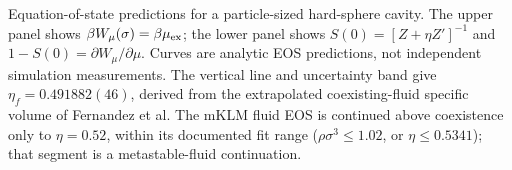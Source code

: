 Equation-of-state predictions for a particle-sized hard-sphere cavity. The upper panel shows $\beta W_\mu(\sigma)=\beta\mu_{\rm ex}$; the lower panel shows $S(0)=[Z+\eta Z']^{-1}$ and $1-S(0)=\partial W_\mu/\partial\mu$. Curves are analytic EOS predictions, not independent simulation measurements. The vertical line and uncertainty band give $\eta_f=0.491882(46)$, derived from the extrapolated coexisting-fluid specific volume of Fernandez et al. The mKLM fluid EOS is continued above coexistence only to $\eta=0.52$, within its documented fit range ($\rho\sigma^3\leq1.02$, or $\eta\leq0.5341$); that segment is a metastable-fluid continuation.
